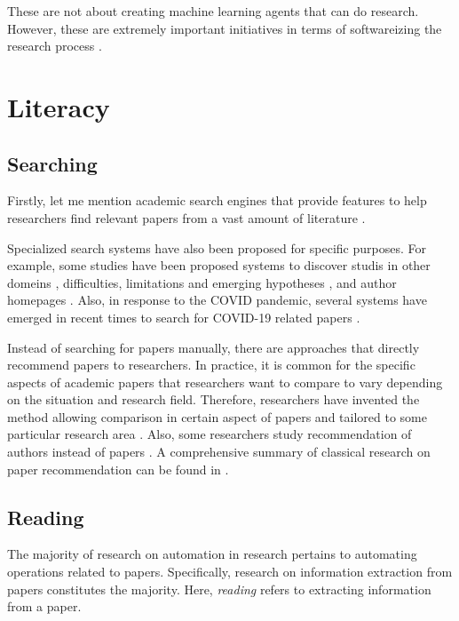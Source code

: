 \documentclass{book}
\begin{document}
These are not about creating machine learning agents that can do research. However, these are extremely important initiatives in terms of softwareizing the research process \cite{deelman2015pegasus,gil2011semantic}.

\section{Literacy}

\subsection{Searching}

Firstly, let me mention academic search engines that provide features to help researchers find relevant papers from a vast amount of literature \cite{googlescholar,semanticscholar,dblp,pubmed,citeseerx}. 

Specialized search systems have also been proposed for specific purposes. For example, some studies have been proposed systems to discover studis in other domeins \cite{kang2022augmenting}, difficulties, limitations and emerging hypotheses \cite{lahav2022search}, and author homepages \cite{patel2021author}. Also, in response to the COVID pandemic, several systems have emerged in recent times to search for COVID-19 related papers \cite{hope2020scisight}.

Instead of searching for papers manually, there are approaches that directly recommend papers to researchers. In practice, it is common for the specific aspects of academic papers that researchers want to compare to vary depending on the situation and research field. Therefore, researchers have invented the method allowing comparison in certain aspect of papers \cite{ostendorff2020aspect} and tailored to some particular research area \cite{breitinger2022recommending}. Also, some researchers study recommendation of authors instead of papers \cite{portenoy2022bursting}. A comprehensive summary of classical research on paper recommendation can be found in \cite{bai2019scientific}.

\subsection{Reading}
The majority of research on automation in research pertains to automating operations related to papers. Specifically, research on information extraction from papers constitutes the majority. Here, \textit{reading} refers to extracting information from a paper.
\end{document}
